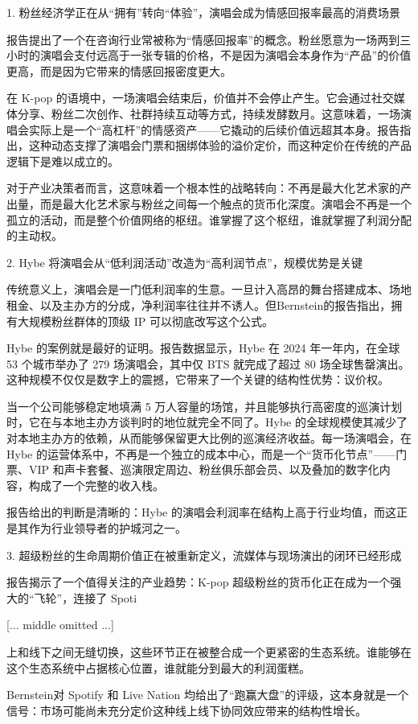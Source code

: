 \documentclass[11pt]{ctexart}
\begin{document}
1. 粉丝经济学正在从“拥有”转向“体验”，演唱会成为情感回报率最高的消费场景

报告提出了一个在咨询行业常被称为“情感回报率”的概念。粉丝愿意为一场两到三小时的演唱会支付远高于一张专辑的价格，不是因为演唱会本身作为“产品”的价值更高，而是因为它带来的情感回报密度更大。

在 K-pop 的语境中，一场演唱会结束后，价值并不会停止产生。它会通过社交媒体分享、粉丝二次创作、社群持续互动等方式，持续发酵数月。这意味着，一场演唱会实际上是一个“高杠杆”的情感资产——它撬动的后续价值远超其本身。报告指出，这种动态支撑了演唱会门票和捆绑体验的溢价定价，而这种定价在传统的产品逻辑下是难以成立的。

对于产业决策者而言，这意味着一个根本性的战略转向：不再是最大化艺术家的产出量，而是最大化艺术家与粉丝之间每一个触点的货币化深度。演唱会不再是一个孤立的活动，而是整个价值网络的枢纽。谁掌握了这个枢纽，谁就掌握了利润分配的主动权。

2. Hybe 将演唱会从“低利润活动”改造为“高利润节点”，规模优势是关键

传统意义上，演唱会是一门低利润率的生意。一旦计入高昂的舞台搭建成本、场地租金、以及主办方的分成，净利润率往往并不诱人。但Bernstein的报告指出，拥有大规模粉丝群体的顶级 IP 可以彻底改写这个公式。

Hybe 的案例就是最好的证明。报告数据显示，Hybe 在 2024 年一年内，在全球 53 个城市举办了 279 场演唱会，其中仅 BTS 就完成了超过 80 场全球售罄演出。这种规模不仅仅是数字上的震撼，它带来了一个关键的结构性优势：议价权。

当一个公司能够稳定地填满 5 万人容量的场馆，并且能够执行高密度的巡演计划时，它在与本地主办方谈判时的地位就完全不同了。Hybe 的全球规模使其减少了对本地主办方的依赖，从而能够保留更大比例的巡演经济收益。每一场演唱会，在 Hybe 的运营体系中，不再是一个独立的成本中心，而是一个“货币化节点”——门票、VIP 和声卡套餐、巡演限定周边、粉丝俱乐部会员、以及叠加的数字化内容，构成了一个完整的收入栈。

报告给出的判断是清晰的：Hybe 的演唱会利润率在结构上高于行业均值，而这正是其作为行业领导者的护城河之一。

3. 超级粉丝的生命周期价值正在被重新定义，流媒体与现场演出的闭环已经形成

报告揭示了一个值得关注的产业趋势：K-pop 超级粉丝的货币化正在成为一个强大的“飞轮”，连接了 Spoti

[... middle omitted ...]

上和线下之间无缝切换，这些环节正在被整合成一个更紧密的生态系统。谁能够在这个生态系统中占据核心位置，谁就能分到最大的利润蛋糕。

Bernstein对 Spotify 和 Live Nation 均给出了“跑赢大盘”的评级，这本身就是一个信号：市场可能尚未充分定价这种线上线下协同效应带来的结构性增长。
\end{document}
